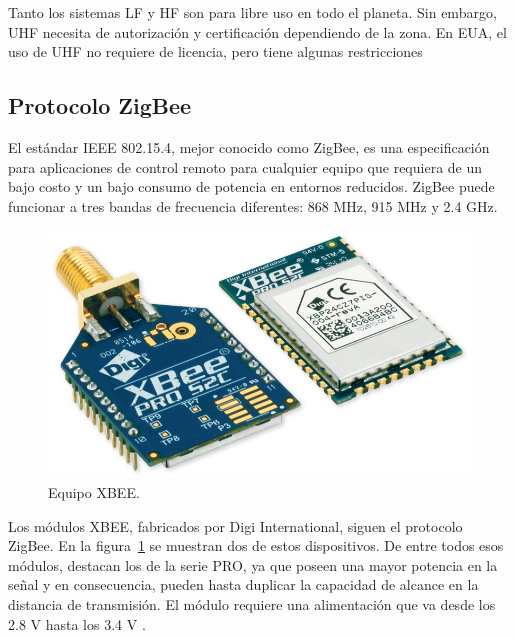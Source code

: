 Tanto los sistemas LF y HF son para libre uso en todo el planeta. Sin embargo, UHF necesita de autorización y certificación dependiendo de la zona. En EUA, el uso de UHF no requiere de licencia, pero tiene algunas restricciones \citep{tapia2007identificacion}

\subsection{Protocolo ZigBee}

El estándar IEEE 802.15.4, mejor conocido como ZigBee, es una especificación para aplicaciones de control remoto para cualquier equipo que requiera de un bajo costo y un bajo consumo de potencia en entornos reducidos. ZigBee puede funcionar a tres bandas de frecuencia diferentes: 868 MHz, 915 MHz y 2.4 GHz. \\

\begin{figure}[ht]
\centering
\includegraphics[scale=0.60]{Figures/xbee}
\caption[Equipo XBEE.]{Equipo XBEE\footnotemark.}
\label{fig:XBEE}
\end{figure}


Los módulos XBEE, fabricados por Digi International, siguen el protocolo ZigBee. En la figura~\ref{fig:XBEE} se muestran dos de estos dispositivos. De entre todos esos módulos, destacan los de la serie PRO, ya que poseen una mayor potencia en la señal y en consecuencia, pueden hasta duplicar la capacidad de alcance en la distancia de transmisión. El módulo requiere una alimentación que va desde los 2.8 V hasta los 3.4 V \citep{oyarce2010guia}.

